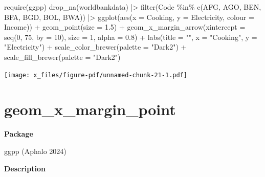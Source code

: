 \documentclass[
  letterpaper,
  DIV=11,
  numbers=noendperiod]{scrreprt}
\newenvironment{Shaded}{\begin{snugshade}}{\end{snugshade}}
\newcommand{\AttributeTok}[1]{\textcolor[rgb]{0.40,0.45,0.13}{#1}}
\newcommand{\DecValTok}[1]{\textcolor[rgb]{0.68,0.00,0.00}{#1}}
\newcommand{\FloatTok}[1]{\textcolor[rgb]{0.68,0.00,0.00}{#1}}
\newcommand{\FunctionTok}[1]{\textcolor[rgb]{0.28,0.35,0.67}{#1}}
\newcommand{\NormalTok}[1]{\textcolor[rgb]{0.00,0.23,0.31}{#1}}
\newcommand{\SpecialCharTok}[1]{\textcolor[rgb]{0.37,0.37,0.37}{#1}}
\newcommand{\StringTok}[1]{\textcolor[rgb]{0.13,0.47,0.30}{#1}}
\begin{document}
\begin{Shaded}
\begin{Highlighting}[]
\FunctionTok{require}\NormalTok{(ggpp)}
\FunctionTok{drop\_na}\NormalTok{(worldbankdata) }\SpecialCharTok{|\textgreater{}}
  \FunctionTok{filter}\NormalTok{(Code }\SpecialCharTok{\%in\%} \FunctionTok{c}\NormalTok{(}\StringTok{\textquotesingle{}AFG\textquotesingle{}}\NormalTok{, }\StringTok{\textquotesingle{}AGO\textquotesingle{}}\NormalTok{, }\StringTok{\textquotesingle{}BEN\textquotesingle{}}\NormalTok{, }\StringTok{\textquotesingle{}BFA\textquotesingle{}}\NormalTok{, }\StringTok{\textquotesingle{}BGD\textquotesingle{}}\NormalTok{, }\StringTok{\textquotesingle{}BOL\textquotesingle{}}\NormalTok{, }\StringTok{\textquotesingle{}BWA\textquotesingle{}}\NormalTok{)) }\SpecialCharTok{|\textgreater{}} 
  \FunctionTok{ggplot}\NormalTok{(}\FunctionTok{aes}\NormalTok{(}\AttributeTok{x =}\NormalTok{ Cooking, }\AttributeTok{y =}\NormalTok{ Electricity, }\AttributeTok{colour =}\NormalTok{ Income)) }\SpecialCharTok{+}
  \FunctionTok{geom\_point}\NormalTok{(}\AttributeTok{size =} \FloatTok{1.5}\NormalTok{) }\SpecialCharTok{+} 
  \FunctionTok{geom\_x\_margin\_arrow}\NormalTok{(}\AttributeTok{xintercept =} \FunctionTok{seq}\NormalTok{(}\DecValTok{0}\NormalTok{, }\DecValTok{75}\NormalTok{, }\AttributeTok{by =} \DecValTok{10}\NormalTok{), }\AttributeTok{size =} \DecValTok{1}\NormalTok{, }\AttributeTok{alpha =} \FloatTok{0.8}\NormalTok{) }\SpecialCharTok{+}
  \FunctionTok{labs}\NormalTok{(}\AttributeTok{title =} \StringTok{""}\NormalTok{, }\AttributeTok{x =} \StringTok{"Cooking"}\NormalTok{, }\AttributeTok{y =} \StringTok{"Electricity"}\NormalTok{)  }\SpecialCharTok{+} \FunctionTok{scale\_color\_brewer}\NormalTok{(}\AttributeTok{palette =} \StringTok{"Dark2"}\NormalTok{) }\SpecialCharTok{+} \FunctionTok{scale\_fill\_brewer}\NormalTok{(}\AttributeTok{palette =} \StringTok{"Dark2"}\NormalTok{)}
\end{Highlighting}
\end{Shaded}

\texttt{[image: x\_files/figure-pdf/unnamed-chunk-21-1.pdf]}

\section{geom\_x\_margin\_point}\label{x_margin_point}

\textbf{Package}

ggpp (Aphalo 2024)

\textbf{Description}
\end{document}
